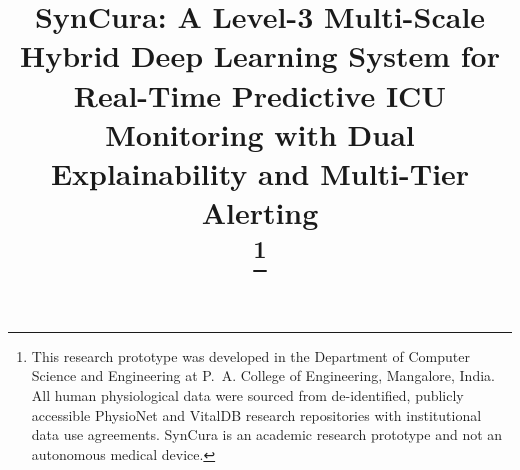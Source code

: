 \documentclass[conference]{IEEEtran}
\begin{document}
\title{SynCura: A Level-3 Multi-Scale Hybrid Deep Learning System for Real-Time Predictive ICU Monitoring with Dual Explainability and Multi-Tier Alerting\\
\thanks{This research prototype was developed in the Department of Computer Science and Engineering at P.~A. College of Engineering, Mangalore, India. All human physiological data were sourced from de-identified, publicly accessible PhysioNet and VitalDB research repositories with institutional data use agreements. SynCura is an academic research prototype and not an autonomous medical device.}
}

\author{
}

\maketitle
\end{document}
